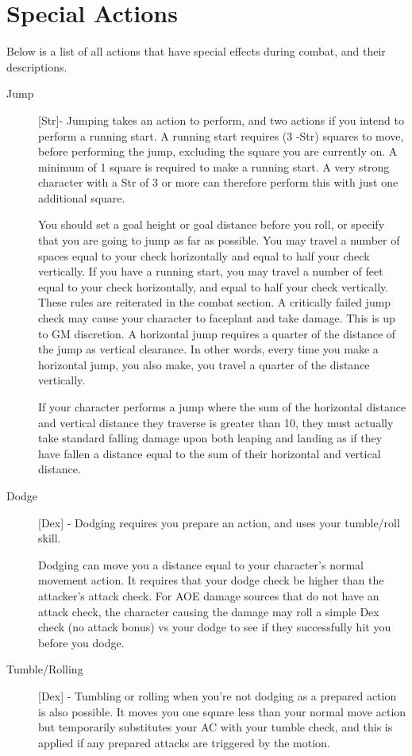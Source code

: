\section{Special Actions}
Below is a list of all actions that have special effects during combat, and their descriptions.
\begin{description}
\item[Jump] [Str]- Jumping takes an action to perform, and two actions if you intend to perform a running start. A running start requires (3 -Str) squares to move, before performing the jump, excluding the square you are currently on. A minimum of 1 square is required to make a running start. A very strong character with a Str of 3 or more can therefore perform this with just one additional square.

You should set a goal height or goal distance before you roll, or specify that you are going to jump as far as possible. You may travel a number of spaces equal to your check horizontally and equal to half your check vertically. If you have a running start, you may travel a number of feet equal to your check horizontally, and equal to half your check vertically. These rules are reiterated in the combat section. A critically failed jump check may cause your character to faceplant and take damage. This is up to GM discretion. A horizontal jump requires a quarter of the distance of the jump as vertical clearance. In other words, every time you make a horizontal jump, you also make, you travel a quarter of the distance vertically.

If your character performs a jump where the sum of the horizontal distance and vertical distance they traverse is greater than 10, they must actually take standard falling damage upon both leaping and landing as if they have fallen a distance equal to the sum of their horizontal and vertical distance.
\item[Dodge] [Dex] - Dodging requires you prepare an action, and uses your tumble/roll skill.

Dodging can move you a distance equal to your character’s normal movement action. It requires that your dodge check be higher than the attacker’s attack check. For AOE damage sources that do not have an attack check, the character causing the damage may roll a simple Dex check (no attack bonus) vs your dodge to see if they successfully hit you before you dodge.

\item[Tumble/Rolling] [Dex] - Tumbling or rolling when you’re not dodging as a prepared action is also possible. It moves you one square less than your normal move action but temporarily substitutes your AC with your tumble check, and this is applied if any prepared attacks are triggered by the motion.


\end{description}

